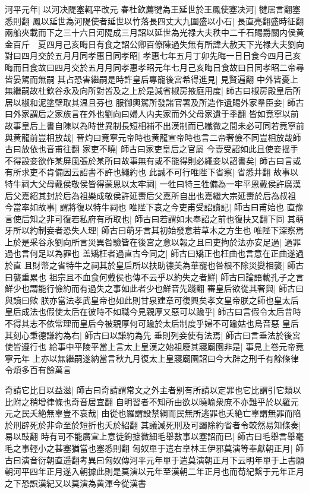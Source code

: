 河平元年|{
	以河决隄塞輒平改元}
春杜欽薦犍為王延世於王鳳使塞决河|{
	犍居言翻塞悉則翻}
鳳以延世為河隄使者延世以竹落長四丈大九圍盛以小石|{
	長直亮翻盛時征翻}
兩船夾載而下之三十六日河隄成三月詔以延世為光禄大夫秩中二千石賜爵關内侯黄金百斤　夏四月己亥晦日有食之詔公卿百僚陳過失無有所諱大赦天下光禄大夫劉向對曰四月交於五月月同孝惠日同孝昭|{
	孝惠七年五月丁卯先晦一日日食今四月己亥晦而日食故曰四月交於五月月同孝惠孝昭元年七月己亥晦日食故曰日同孝昭二帝尋皆晏駕而無嗣}
其占恐害繼嗣是時許皇后專寵後宮希得進見|{
	見賢遍翻}
中外皆憂上無繼嗣故杜欽谷永及向所對皆及之上於是減省椒房掖庭用度|{
	師古曰椒房殿皇后所居以椒和泥塗壁取其温且芬也}
服御輿駕所發諸官署及所造作遺賜外家羣臣妾|{
	師古曰外家謂后之家族言在外也劉向曰婦人内夫家而外父母家遺于季翻}
皆如竟寧以前故事皇后上書自陳以為時世異制長短相補不出漢制而已纎微之間未必可同若竟寧前與黄龍前豈相放哉|{
	晉灼曰竟寧元帝時也黄龍宣帝時也言二帝奢儉不同豈相放哉師古曰放依也音甫往翻}
家吏不曉|{
	師古曰家吏皇后之官屬}
今壹受詔如此且使妾揺手不得設妾欲作某屏風張於某所曰故事無有或不能得則必繩妾以詔書矣|{
	師古曰言或有所求吏不肯備因云詔書不許也繩約也}
此誠不可行唯陛下省察|{
	省悉井翻}
故事以特牛祠大父母戴侯敬侯皆得蒙恩以太牢祠|{
	一牲曰特三牲備為一牢平恩戴侯許廣漢后父嘉紹其封於后為祖樂成敬侯許延夀后父嘉所自出也嘉繼大宗延夀於后為叔祖}
今當率如故事|{
	謂將復以特牛祠也}
唯陛下哀之今吏甫受詔讀記|{
	師古曰甫始也}
直豫言使后知之非可復若私府有所取也|{
	師古曰若謂如未奉詔之前也復扶又翻下同}
其萌牙所以約制妾者恐失人理|{
	師古曰萌牙言其初始發意若草木之方生也}
唯陛下深察焉上於是采谷永劉向所言災異咎驗皆在後宮之意以報之且曰吏拘於法亦安足過|{
	過罪過也言何足以為罪也}
盖矯枉者過直古今同之|{
	師古曰矯正也枉曲也言意在正曲遂過於直}
且財幣之省特牛之祠其於皇后所以扶助德美為華寵也咎根不除災變相襲|{
	師古曰襲重累也}
祖宗且不血食何戴侯也傳不云乎以約失之者鮮|{
	師古曰論語載孔子之言鮮少也謂能行儉約而有過失之事如此者少也鮮音先踐翻}
審皇后欲從其奢與|{
	師古曰與讀曰歟}
朕亦當法孝武皇帝也如此則甘泉建章可復興矣孝文皇帝朕之師也皇太后皇后成法也假使太后在彼時不如職今見親厚又惡可以踰乎|{
	師古曰言假令太后昔時不得其志不依常理而皇后今被親厚何可踰於太后制度乎婦不可踰姑也烏音惡}
皇后其刻心秉德謙約為右|{
	師古曰以謙約為先}
垂則列妾使有法焉|{
	師古曰言垂法於後宮使皆遵行也}
給事中平陵平當上言太上皇漢之始祖廢其寢廟園非是|{
	事見上卷元帝竟寧元年}
上亦以無繼嗣遂納當言秋九月復太上皇寢廟園詔曰今大辟之刑千有餘條律令煩多百有餘萬言

奇請它比日以益滋|{
	師古曰奇請謂常文之外主者别有所請以定罪也它比謂引它類以比附之稍增律條也奇音居宜翻}
自明習者不知所由欲以曉喻衆庶不亦難乎於以羅元元之民夭絶無辜豈不哀哉|{
	由從也羅謂設禁綱而民無所逃罪也夭絶亡辜謂無罪而陷於刑辟死於非命至於短折也夭於紹翻}
其議減死刑及可蠲除約省者令較然易知條奏|{
	易以豉翻}
時有司不能廣宣上意徒鉤摭微細毛舉數事以塞詔而已|{
	師古曰毛舉言舉毫毛之事輕小之甚塞猶當也塞悉則翻}
匈奴單于遣右臯林王伊邪莫演等奉獻朝正月|{
	師古曰演音衍朝直遥翻考異曰匈奴傳河平元年單于遣莫演朝正月下云明年單于上書願朝河平四年正月遂入朝據此則是莫演以元年至漢朝二年正月也而荀紀繫于元年正月之下恐誤漢紀又以莫演為黄渾今從漢書}


